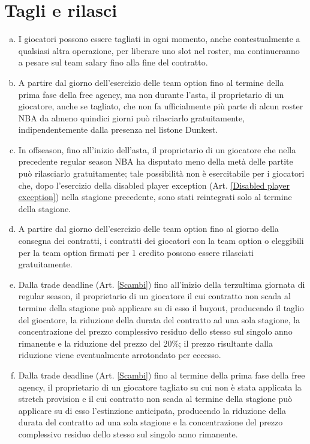 \documentclass{article}
\begin{document}
\section{Tagli e rilasci}\label{Tagli e rilasci}
\begin{enumerate}[(a)]
\item I giocatori possono essere tagliati in ogni momento, anche contestualmente a qualsiasi altra operazione, per liberare uno slot nel roster, ma continueranno a pesare sul team salary fino alla fine del contratto. 
\item A partire dal giorno dell'esercizio delle team option fino al termine della prima fase della free agency, ma non durante l'asta, il proprietario di un giocatore, anche se tagliato, che non fa ufficialmente più parte di alcun roster NBA da almeno quindici giorni può rilasciarlo gratuitamente, indipendentemente dalla presenza nel listone Dunkest.
\item In offseason, fino all'inizio dell'asta, il proprietario di un giocatore che nella precedente regular season NBA ha disputato meno della metà delle partite può rilasciarlo gratuitamente; tale possibilità non è esercitabile per i giocatori che, dopo l'esercizio della disabled player exception (Art. \ref{Disabled player exception}) nella stagione precedente, sono stati reintegrati solo al termine della stagione.
\item A partire dal giorno dell'esercizio delle team option fino al giorno della consegna dei contratti, i contratti dei giocatori con la team option o eleggibili per la team option firmati per 1 credito possono essere rilasciati gratuitamente.
\item Dalla trade deadline (Art. \ref{Scambi}) fino all'inizio della terzultima giornata di regular season, il proprietario di un giocatore il cui contratto non scada al termine della stagione può applicare su di esso il buyout, producendo il taglio del giocatore, la riduzione della durata del contratto ad una sola stagione, la concentrazione del prezzo complessivo residuo dello stesso sul singolo anno rimanente e la riduzione del prezzo del 20\%; il prezzo risultante dalla riduzione viene eventualmente arrotondato per eccesso.
\item Dalla trade deadline (Art. \ref{Scambi}) fino al termine della prima fase della free agency, il proprietario di un giocatore tagliato su cui non è stata applicata la stretch provision e il cui contratto non scada al termine della stagione può applicare su di esso l'estinzione anticipata, producendo la riduzione della durata del contratto ad una sola stagione e la concentrazione del prezzo complessivo residuo dello stesso sul singolo anno rimanente.

\end{enumerate}
\end{document}
